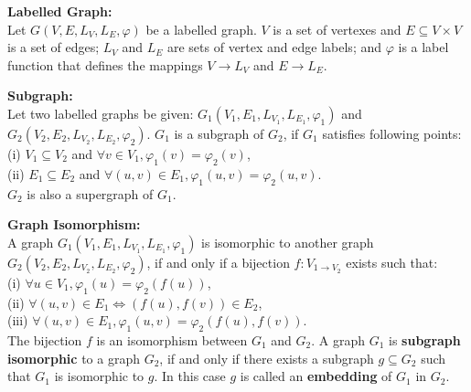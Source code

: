 \documentclass[12pt,a4paper]{article}
\begin{document}
\begin{samepage}
\noindent \textbf{Labelled Graph:}\\
Let $G(V,E,L_{V},L_{E},\varphi)$ be a labelled graph.
$V$ is a set of vertexes and $E \subseteq V \times V$ is a set of edges;
$L_{V}$ and $L_{E}$ are sets of vertex and edge labels;
and $\varphi$ is a label function that defines the mappings $V \rightarrow L_{V}$ and $E \rightarrow L_{E}$.\\
\end{samepage}


\begin{samepage}
\noindent \textbf{Subgraph:}\\
Let two labelled graphs be given: $G_{1}(V_{1},E_{1},L_{V_{1}},L_{E_{1}},\varphi_{1})$ and $G_{2}(V_{2},E_{2},L_{V_{2}},L_{E_{2}},\varphi_{2})$.
$G_{1}$ is a subgraph of $G_{2}$, if $G_{1}$ satisfies following points: \\
(i) $V_{1} \subseteq V_{2}$ and 
$\forall v \in V_{1}, \varphi_{1}(v) = \varphi_{2}(v)$,\\
(ii) $E_{1} \subseteq E_{2}$ and $\forall (u,v) \in E_{1}, \varphi_{1}(u,v) = \varphi_{2}(u,v)$.\\
$G_{2}$ is also a supergraph of $G_{1}$.\\
\end{samepage}



\begin{samepage}
\noindent  \textbf{Graph Isomorphism:}\\
A graph $G_{1}(V_{1},E_{1},L_{V_{1}},L_{E_{1}},\varphi_{1})$ is isomorphic to another graph $G_{2}(V_{2},E_{2},L_{V_{2}},L_{E_{2}},\varphi_{2})$, if and only if a bijection $f:V_{1 \rightarrow V_{2}}$ exists such that:\\
(i) $\forall u \in V_{1}, \varphi_{1}(u) = \varphi_{2}(f(u))$,\\
(ii) $\forall (u,v) \in E_{1} \Leftrightarrow (f(u),f(v)) \in E_{2}$,\\
(iii) $\forall (u,v) \in E_{1}, \varphi_{1}(u,v) = \varphi_{2}(f(u),f(v))$.\\
The bijection $f$ is an isomorphism between $G_{1}$ and $G_{2}$. 
A graph $G_{1}$ is \textbf{subgraph isomorphic} to a graph $G_{2}$, if and only if there exists a subgraph $g \subseteq G_{2}$ such that $G_{1}$ is isomorphic to $g$. 
In this case $g $ is called an \textbf{embedding} of $G_{1}$ in $G_{2}$.\\
\end{samepage}
\end{document}
